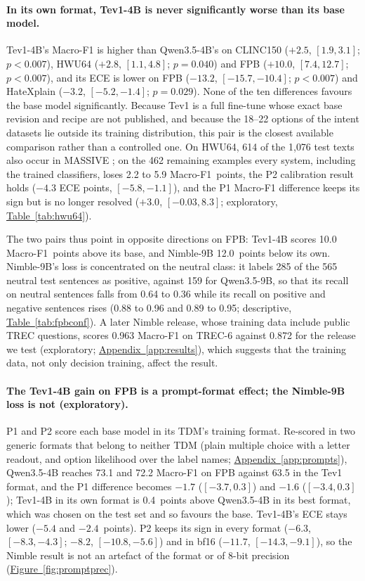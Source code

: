 \paragraph{In its own format, Tev1-4B is never significantly worse than its base model.}
Tev1-4B's Macro-F1 is higher than Qwen3.5-4B's on CLINC150 ($+2.5$, $[1.9, 3.1]$; $p<0.007$), HWU64 ($+2.8$,
$[1.1, 4.8]$; $p=0.040$) and FPB ($+10.0$, $[7.4, 12.7]$; $p<0.007$), and its ECE is lower on FPB ($-13.2$,
$[-15.7,-10.4]$; $p<0.007$) and HateXplain ($-3.2$, $[-5.2,-1.4]$; $p=0.029$). None of the ten differences favours the
base model significantly. Because Tev1 is a full fine-tune whose exact base revision and recipe are not published, and
because the 18--22 options of the intent datasets lie outside its training distribution, this pair is the closest
available comparison rather than a controlled one. On HWU64, 614 of the 1{,}076 test texts also occur in MASSIVE
\citep{fitzgerald2023massive}; on the 462 remaining examples every system, including the trained classifiers, loses 2.2
to 5.9 Macro-F1~points, the P2 calibration result holds ($-4.3$ ECE points, $[-5.8,-1.1]$), and the P1 Macro-F1
difference keeps its sign but is no longer resolved ($+3.0$, $[-0.03, 8.3]$; exploratory, \hyperref[tab:hwu64]{Table~\ref*{tab:hwu64}}).

The two pairs thus point in opposite directions on FPB: Tev1-4B scores 10.0 Macro-F1~points above its base, and
Nimble-9B 12.0~points below its own. Nimble-9B's loss is concentrated on the neutral class: it labels 285 of the 565
neutral test sentences as positive, against 159 for Qwen3.5-9B, so that its recall on neutral sentences falls from 0.64
to 0.36 while its recall on positive and negative sentences rises (0.88 to 0.96 and 0.89 to 0.95; descriptive,
\hyperref[tab:fpbconf]{Table~\ref*{tab:fpbconf}}). A later Nimble release, whose training data include public TREC questions, scores
0.963 Macro-F1 on TREC-6 against 0.872 for the release we test (exploratory; \hyperref[app:results]{Appendix~\ref*{app:results}}), which
suggests that the training data, not only decision training, affect the result.

\paragraph{The Tev1-4B gain on FPB is a prompt-format effect; the Nimble-9B loss is not (exploratory).}
P1 and P2 score each base model in its TDM's training format. Re-scored in two generic formats that belong to neither
TDM (plain multiple choice with a letter readout, and option likelihood over the label names;
\hyperref[app:prompts]{Appendix~\ref*{app:prompts}}), Qwen3.5-4B reaches 73.1 and 72.2 Macro-F1 on FPB against 63.5 in
the Tev1 format, and the P1 difference becomes $-1.7$ ($[-3.7, 0.3]$) and $-1.6$ ($[-3.4, 0.3]$); Tev1-4B in its own
format is 0.4~points above Qwen3.5-4B in its best format, which was chosen on the test set and so favours the base.
Tev1-4B's ECE stays lower ($-5.4$ and $-2.4$~points). P2 keeps its sign in every format ($-6.3$, $[-8.3,-4.3]$;
$-8.2$, $[-10.8,-5.6]$) and in bf16 ($-11.7$, $[-14.3,-9.1]$), so the Nimble result is not an artefact of the format
or of 8-bit precision (\hyperref[fig:promptprec]{Figure~\ref*{fig:promptprec}}).

